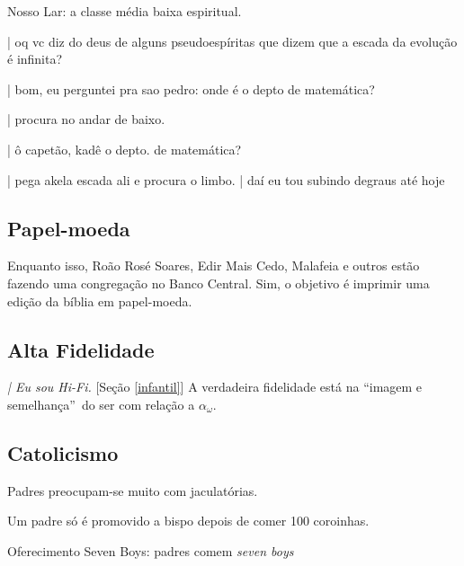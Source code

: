 \documentclass[12pt,a4paper]{article}
\begin{document}
		Nosso Lar: a classe m\'edia baixa espiritual.

		\begin{flushright}
		\end{flushright}

| oq vc diz do deus de alguns pseudoesp\'iritas que dizem que a escada da evolu\c{c}\~ao \'e infinita?

| bom, eu perguntei pra sao pedro: onde \'e o depto de matem\'atica?

| procura no andar de baixo.

| \^o capet\~ao, kad\^e o depto. de matem\'atica?

| pega akela escada ali e procura o limbo. | da\'i eu tou subindo degraus at\'e hoje

		\subsection{Papel-moeda}
			\begin{flushright}
			\end{flushright}

		Enquanto isso, Ro\~ao Ros\'e Soares, Edir Mais Cedo, Malafeia e outros est\~ao fazendo uma congrega\c{c}\~ao no Banco Central. Sim, o objetivo \'e imprimir uma edi\c{c}\~ao da b\'iblia em papel-moeda.

		\subsection{Alta Fidelidade}
			\begin{flushright}
			\end{flushright}

			\emph{| Eu sou Hi-Fi.} [Se\c{c}\~ao \ref{infantil}]
			A verdadeira fidelidade est\'a na \textquotedblleft imagem e semelhan\c{c}a\textquotedblright\, do ser com rela\c{c}\~ao a $ \alpha_\omega $.

		\subsection{Catolicismo}\label{humorCatolica}
			\begin{flushright}
			\end{flushright}

			Padres preocupam-se muito com jaculat\'orias.

			Um padre s\'o \'e promovido a bispo depois de comer 100 coroinhas.

			Oferecimento Seven Boys: padres comem \emph{seven boys}
\end{document}
